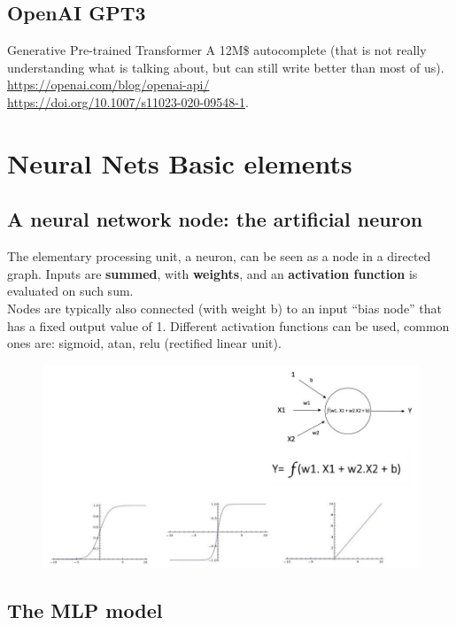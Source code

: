 \subsection{OpenAI GPT3}

Generative Pre-trained Transformer A 12M\$ autocomplete (that is not really understanding what is talking about, but can still write better than most of us). \url{https://openai.com/blog/openai-api/}\\
\url{https://doi.org/10.1007/s11023-020-09548-1}.
\section{Neural Nets Basic elements}
\subsection{A neural network node: the artificial neuron}
The elementary processing unit, a neuron, can be seen as a node in a directed graph. Inputs are \textbf{summed}, with \textbf{weights}, and an \textbf{activation function} is evaluated on such sum.\\
Nodes are typically also connected (with weight b) to an input “bias node” that has a fixed output value of 1. Different activation functions can be used, common ones are: sigmoid, atan, relu (rectified linear unit).

\begin{figure}[ht]
	\centering
	\includegraphics[width=0.7\linewidth]{figure_ml/neuron.png}
\end{figure}
\FloatBarrier


\subsection{The MLP model}

